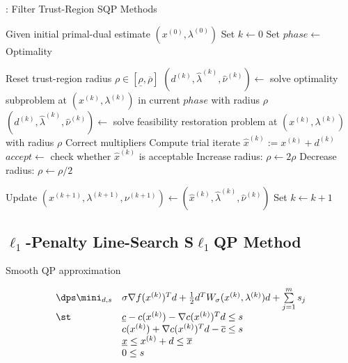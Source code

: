 \medskip
\begin{algorithm}[H]
\caption{\solvername{}: Filter Trust-Region SQP Methods}
Given initial primal-dual estimate $(x^{(0)}, \lambda^{(0)})$ \;
Set $k \gets 0$ \;
\globalizationstrategy Set $\mathit{phase} \gets$ Optimality \;
 {
	\colorbox[gray]{0.95}{
	\begin{minipage}{0.88\textwidth}
	Reset trust-region radius $\rho \in [\underline{\rho}, \overline{\rho}]$ \;
	 {
		$(d^{(k)}, \hat{\lambda}^{(k)}, \hat{\nu}^{(k)}) \gets$ solve optimality subproblem at $(x^{(k)}, \lambda^{(k)})$ in current $\mathit{phase}$ with radius $\rho$ \;
		 {
		$(d^{(k)}, \hat{\lambda}^{(k)}, \hat{\nu}^{(k)}) \gets$ solve feasibility restoration problem at $(x^{(k)}, \lambda^{(k)})$ with radius $\rho$ \;
		}
		Correct multipliers \;
		Compute trial iterate $\hat{x}^{(k)} := x^{(k)} + d^{(k)}$ \;
		\globalizationstrategy $\mathit{accept} \gets$ check whether $\hat{x}^{(k)}$ is acceptable \;
		 {
			 {
				Increase radius: $\rho \gets 2 \rho$ \;
			}
		}{
			Decrease radius: $\rho \gets \rho/2$ \;
		}
	}
	\end{minipage}} \;
	Update $(x^{(k+1)}, \lambda^{(k+1)}, \nu^{(k+1)}) \gets (\hat{x}^{(k)}, \hat{\lambda}^{(k)}, \hat{\nu}^{(k)})$ \;
	Set $k \gets k+1$ \;
}
\end{algorithm}
\medskip

\subsection{$\ell_1$-Penalty Line-Search S$\ell_1$QP Method}

Smooth QP approximation

\begin{equation}
\begin{array}{lll} \dps
\mini_{d,s} & \sigma \nabla f(x^{(k)})^T d + \frac{1}{2} d^T W_\sigma(x^{(k)}, \lambda^{(k)}) d + \sum\limits_{j = 1}^m s_j \\
\st 		& \underline{c} - c(x^{(k)}) - \nabla c(x^{(k)})^T d \le s \\
			& c(x^{(k)}) + \nabla c(x^{(k)})^T d - \overline{c} \le s \\
			& \underline{x} \le x^{(k)} + d \le \overline{x} \\
			& 0 \le s \\
\end{array}
\end{equation}

